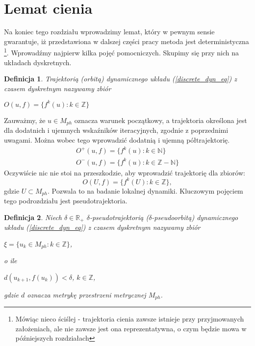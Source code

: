 \documentclass[12pt, twoside]{book}
\newtheorem{defi}{Definicja}
\begin{document}
\section{Lemat cienia}
Na koniec tego rozdziału wprowadzimy lemat, który w pewnym sensie gwarantuje, iż przedstawiona w dalszej części pracy metoda jest deterministyczna \footnote{Mówiąc nieco ściślej - trajektoria cienia zawsze istnieje przy przyjmowanych założeniach, ale nie zawsze jest ona reprezentatywna, o czym będzie mowa w późniejszych rozdziałach}. Wprowadźmy najpierw kilka pojęć pomocniczych. Skupimy się przy nich na układach dyskretnych. 
\begin{defi}\label{trajectory_discrete}
	Trajektorią (orbitą) dynamicznego układu (\ref{discrete_dyn_eq}) z czasem dyskretnym nazywamy zbiór
	\begin{center}
		$ O(u,f) = \{f^k(u): k \in \mathbb{Z}\} $
	\end{center} 
\end{defi}
Zauważmy, że $ u \in M_{ph} $ oznacza warunek początkowy, a trajektoria określona jest dla dodatnich i ujemnych wskaźników iteracyjnych, zgodnie z poprzednimi uwagami. Można wobec tego wprowadzić dodatnią i ujemną półtrajektorię.
\begin{equation}
\begin{array}{rcl} 
	O^{+}(u,f) = \{f^k(u): k \in \mathbb{N}\} \\
	O^{-}(u,f) = \{f^k(u): k \in \mathbb{Z} - \mathbb{N}\}
\end{array}
\end{equation}
Oczywiście nic nie stoi na przeszkodzie, aby wprowadzić trajektorię dla zbiorów:
\begin{equation}
	O(U,f) = \{f^k(U): k \in \mathbb{Z}\},
\end{equation}
gdzie $ U \subset M_{ph} $. Pozwala to na badanie lokalnej dynamiki. \newline
Kluczowym pojęciem tego podrozdziału jest pseudotrajektoria.
\begin{defi}\label{pseudotrajectory}
	Niech $\delta \in \mathbb{R}_{+}$
	$\delta$-pseudotrajektorią ($ \delta $-pseudoorbitą) dynamicznego układu (\ref{discrete_dyn_eq}) z czasem dyskretnym nazywamy zbiór
	\begin{center}
		$ \xi = \{u_{k} \in M_{ph}: k\in \mathbb{Z}\}$,
	\end{center} 
	o ile
	\begin{center}
		$ d(u_{k+1},f(u_k))<\delta $, $ k \in \mathbb{Z} $,
	\end{center} 
	gdzie $ d $ oznacza metrykę przestrzeni metrycznej $ M_{ph} $.
\end{defi}
\end{document}
